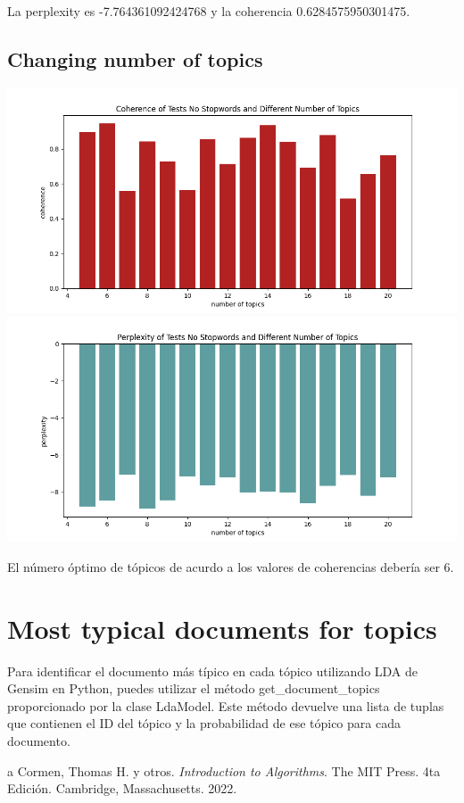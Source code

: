 \documentclass[10pt]{article} %
\begin{document}
	La perplexity es -7.764361092424768 y la coherencia  0.6284575950301475.

	
	\subsection{Changing number of topics}
	
	\begin{center}
		\includegraphics[scale=0.6]{images/coherence_no_stopwords_diff_n_topics}
		\includegraphics[scale=0.6]{images/perplexity_no_stopwords_diff_n_topics}
	\end{center}

	El n\'umero \'optimo de t\'opicos de acurdo a los valores de coherencias deber\'ia ser 6.
	
	
	\section{Most typical documents for topics}
	
	Para identificar el documento más típico en cada tópico utilizando LDA de Gensim en Python, puedes utilizar el método get\_document\_topics proporcionado por la clase LdaModel. Este método devuelve una lista de tuplas que contienen el ID del tópico y la probabilidad de ese tópico para cada documento.
	
	
	
	\begin{thebibliography}
		a
		 Cormen, Thomas H. y otros. \emph{Introduction to Algorithms}. 
		The MIT Press.
		4ta Edici\'on.		
		Cambridge, Massachusetts.
		2022.
	\end{thebibliography}
\end{document}
